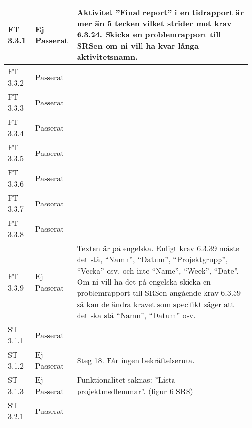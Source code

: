 \documentclass[a4paper]{article}
\begin{document}
\begin{tabular}{| l | l | p{9cm} |}
\hline
FT 3.3.1 & Ej Passerat & Aktivitet ”Final report” i en tidrapport är mer än 5 tecken vilket strider mot krav 6.3.24. Skicka en problemrapport till SRSen om ni vill ha kvar långa aktivitetsnamn. \\
\hline
FT 3.3.2 & Passerat & \\
\hline
FT 3.3.3 & Passerat & \\
\hline
FT 3.3.4 & Passerat & \\
\hline
FT 3.3.5 & Passerat & \\
\hline
FT 3.3.6 & Passerat & \\
\hline
FT 3.3.7 & Passerat & \\
\hline
FT 3.3.8 & Passerat & \\
\hline
FT 3.3.9 & Ej Passerat & Texten är på engelska. Enligt krav 6.3.39 måste det stå, “Namn”, “Datum”, “Projektgrupp”, “Vecka” osv. och inte “Name”, “Week”, “Date”. Om ni vill ha det på engelska skicka en problemrapport till SRSen angående krav 6.3.39 så kan de ändra kravet som specifikt säger att det ska stå “Namn”, “Datum” osv. \\

\hline
ST 3.1.1 & Passerat & \\
\hline
ST 3.1.2 & Ej Passerat & Steg 18. Får ingen bekräftelseruta. \\
\hline
ST 3.1.3 & Ej Passerat & Funktionalitet saknas: ”Lista projektmedlemmar”. (figur 6 SRS) \\
\hline
ST 3.2.1 & Passerat & \\
\hline
\end{tabular}
\end{document}
